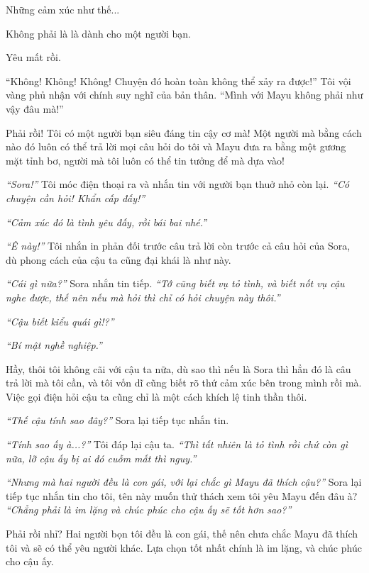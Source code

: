 {    Những cảm xúc như thế...

    Không phải là là dành cho một người bạn.

    Yêu mất rồi.

    ``Không! Không! Không! Chuyện đó hoàn toàn không thể xảy ra được!'' Tôi
    vội vàng phủ nhận với chính suy nghĩ của bản thân. ``Mình với Mayu không
    phải như vậy đâu mà!''

    Phải rồi! Tôi có một người bạn siêu đáng tin cậy cơ mà! Một người mà
    bằng cách nào đó luôn có thể trả lời mọi câu hỏi do tôi và Mayu đưa ra
    bằng một gương mặt tỉnh bơ, người mà tôi luôn có thể tin tưởng để mà dựa
    vào!

    \emph{``Sora!''} Tôi móc điện thoại ra và nhắn tin với người bạn thuở
    nhỏ còn lại. \emph{``Có chuyện cần hỏi! Khẩn cấp đấy!''}

    \emph{``Cảm xúc đó là tình yêu đấy, rồi bái bai nhé.''}

    \emph{``Ê này!''} Tôi nhắn in phản đối trước câu trả lời còn trước cả
    câu hỏi của Sora, dù phong cách của cậu ta cũng đại khái là như này.

    \emph{``Cái gì nữa?''} Sora nhắn tin tiếp. \emph{``Tớ cũng biết vụ tỏ
        tình, và biết nốt vụ cậu nghe được, thế nên nếu mà hỏi thì chỉ có hỏi
        chuyện này thôi.''}

    \emph{``Cậu biết kiểu quái gì!?''}

    \emph{``Bí mật nghề nghiệp.''}

    Hầy, thôi tôi không cãi với cậu ta nữa, dù sao thì nếu là Sora thì hẳn
    đó là câu trả lời mà tôi cần, và tôi vốn dĩ cũng biết rõ thứ cảm xúc bên
    trong mình rồi mà. Việc gọi điện hỏi cậu ta cũng chỉ là một cách khích
    lệ tinh thần thôi.

    \emph{``Thế cậu tính sao đây?''} Sora lại tiếp tục nhắn tin.

    \emph{``Tính sao ấy à...?''} Tôi đáp lại cậu ta. \emph{``Thì tất nhiên
        là tỏ tình rồi chứ còn gì nữa, lỡ cậu ấy bị ai đó cuỗm mất thì nguy.''}

    \emph{``Nhưng mà hai người đều là con gái, với lại chắc gì Mayu đã thích
        cậu?''} Sora lại tiếp tục nhắn tin cho tôi, tên này muốn thử thách xem
    tôi yêu Mayu đến đâu à? \emph{``Chẳng phải là im lặng và chúc phúc cho
        cậu ấy sẽ tốt hơn sao?''}

    Phải rồi nhỉ? Hai người bọn tôi đều là con gái, thế nên chưa chắc Mayu
    đã thích tôi và sẽ có thể yêu người khác. Lựa chọn tốt nhất chính là im
    lặng, và chúc phúc cho cậu ấy.

}
